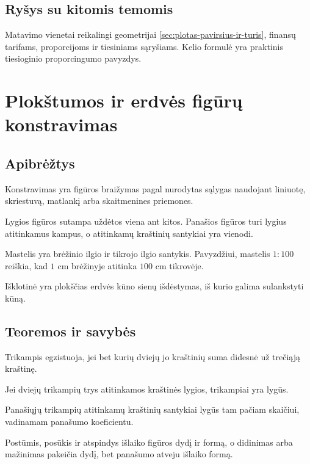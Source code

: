 \subsection{Ryšys su kitomis temomis}
Matavimo vienetai reikalingi geometrijai \ref{sec:plotas-pavirsius-ir-turis}, finansų tarifams, proporcijoms ir tiesiniams sąryšiams. Kelio formulė yra praktinis tiesioginio proporcingumo pavyzdys.

\section{Plokštumos ir erdvės figūrų konstravimas}\label{sec:plokstumos-ir-erdves-figuru-konstravimas}

\subsection{Apibrėžtys}
\begin{apibreztis}
Konstravimas yra figūros braižymas pagal nurodytas sąlygas naudojant liniuotę, skriestuvą, matlankį arba skaitmenines priemones.
\end{apibreztis}
\begin{apibreztis}
Lygios figūros sutampa uždėtos viena ant kitos. Panašios figūros turi lygius atitinkamus kampus, o atitinkamų kraštinių santykiai yra vienodi.
\end{apibreztis}
\begin{apibreztis}
Mastelis yra brėžinio ilgio ir tikrojo ilgio santykis. Pavyzdžiui, mastelis \(1:100\) reiškia, kad \(1\) cm brėžinyje atitinka \(100\) cm tikrovėje.
\end{apibreztis}
\begin{apibreztis}
Išklotinė yra plokščias erdvės kūno sienų išdėstymas, iš kurio galima sulankstyti kūną.
\end{apibreztis}

\subsection{Teoremos ir savybės}
\begin{savybe}
Trikampis egzistuoja, jei bet kurių dviejų jo kraštinių suma didesnė už trečiąją kraštinę.
\end{savybe}
\begin{savybe}
Jei dviejų trikampių trys atitinkamos kraštinės lygios, trikampiai yra lygūs.
\end{savybe}
\begin{savybe}
Panašiųjų trikampių atitinkamų kraštinių santykiai lygūs tam pačiam skaičiui, vadinamam panašumo koeficientu.
\end{savybe}
\begin{savybe}
Postūmis, posūkis ir atspindys išlaiko figūros dydį ir formą, o didinimas arba mažinimas pakeičia dydį, bet panašumo atveju išlaiko formą.
\end{savybe}

